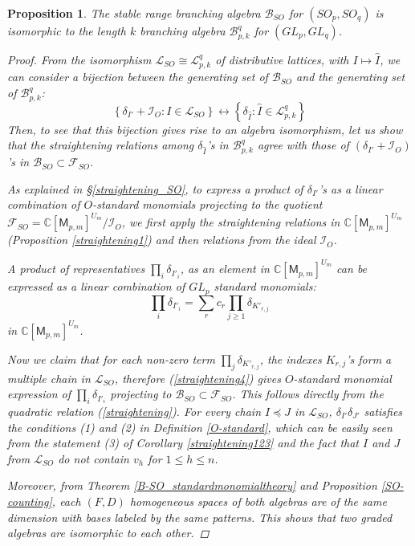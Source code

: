 \documentclass[11pt]{amsart}
\numberwithin{equation}{subsection}
\newtheorem{proposition}[theorem]{Proposition}
\begin{document}
\begin{proposition}
The stable range branching algebra $\mathcal{B}_{{SO}}$ for 
$({SO}_{p},{SO}_{q})$ is isomorphic to the length $k$ branching algebra $\mathcal{B}_{{p,k}}^{q}$
for $(GL_p, GL_q)$.

\begin{proof}
From the isomorphism $\mathcal{L}_{SO} \cong \mathcal{L}_{p,k}^q$ of distributive 
lattices, with $I \mapsto \hat{I}$, we can consider a bijection between the generating set
of $\mathcal{B}_{SO}$ and the generating set of  $\mathcal{B}_{p,k}^q$:
$$\left\{ {\delta}_{I'} + \mathcal{I}_{O}: I\in \mathcal{L}_{SO}\right\} 
\longleftrightarrow  \left\{ \delta_{\hat{I}} : \hat{I} \in \mathcal{L}_{p,k}^q\right\}$$ 
Then, to see that this bijection gives rise to an algebra isomorphism, let us show
that the straightening relations among $\delta_{\hat{I}}$'s in $\mathcal{B}_{p,k}^q$
agree with those of $(\delta_{I'} + \mathcal{I}_{O})$'s in $\mathcal{B}_{{SO}} 
\subset \mathcal{F}_{SO}$.

As explained in \S \ref{straightening_SO}, to express a product of ${\delta}_{I'}$'s 
as a linear combination of $O$-standard monomials projecting to the quotient 
$\mathcal{F}_{SO}=\mathbb{C}[\mathsf{M}_{p,m}]^{U_m} / \mathcal{I}_{O}$, 
we first apply the straightening relations in $\mathbb{C}[\mathsf{M}_{p,m}]^{U_m}$ 
(Proposition \ref{straightening1}) and then relations from the ideal $\mathcal{I}_{O}$. 

A product of representatives $\prod_i {\delta}_{I'_i}$, as an element in  
$\mathbb{C}[\mathsf{M}_{p,m}]^{U_m}$ can be expressed as a linear combination of $GL_{p}$ 
standard monomials:
\begin{equation}\label{straightening4}
\prod_i {{\delta}} _{I'_i}=\sum_{r} c_{r} \prod_{j\geq 1} {{\delta}}_{K'_{r,j}}
\end{equation}
in  $\mathbb{C}[\mathsf{M}_{p,m}]^{U_m}$. 

Now we claim that for each non-zero term $\prod_{j}{\delta}_{K'_{r,j}}$, 
the indexes $K_{r,j}$'s form a multiple chain in $\mathcal{L}_{SO}$, therefore (\ref{straightening4}) gives $O$-standard monomial expression of $\prod_i {\delta}_{I'_i}$ projecting to $\mathcal{B}_{{SO}} \subset \mathcal{F}_{SO}$. This follows directly from the quadratic relation  (\ref{straightening}). For every chain $I \preceq J$ in $\mathcal{L}_{SO}$, $\delta_{I'} \delta_{J'}$ satisfies the conditions (1) and (2) in Definition \ref{O-standard}, which can be easily seen from the statement (3) of Corollary \ref{straightening123} and the fact that $I$ and $J$ from $\mathcal{L}_{SO}$ do not contain $v_h$ for $1 \leq h \leq n$.

Moreover, from Theorem \ref{B-SO_standardmonomialtheory} and
Proposition \ref{SO-counting}, each $(F,D)$ homogeneous spaces of both algebras 
are of the same dimension with bases labeled by the same patterns.
This shows that two graded algebras are isomorphic to each other.
\end{proof}
\end{proposition}
\end{document}
